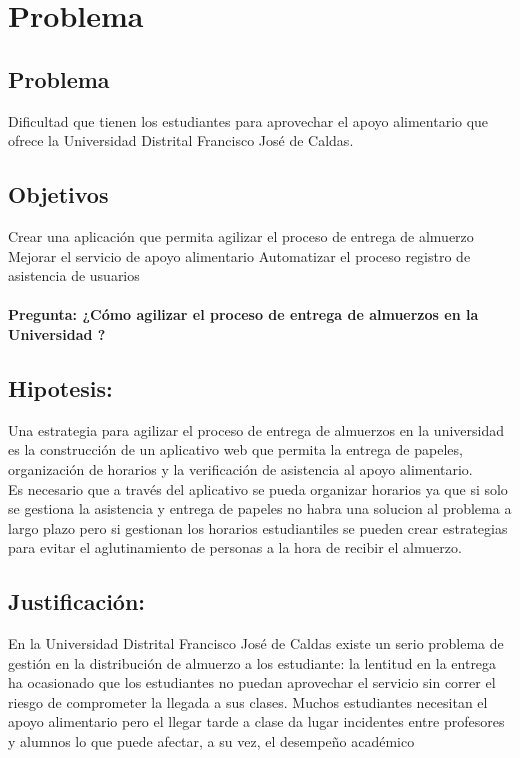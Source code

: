 \chapter{Problema}
\section{Problema}

Dificultad que tienen los estudiantes para aprovechar el apoyo alimentario que ofrece la Universidad Distrital Francisco José de Caldas.



\section{Objetivos}

Crear una aplicación que permita agilizar el proceso de entrega de almuerzo
Mejorar el servicio de apoyo alimentario 
Automatizar el proceso registro de asistencia de usuarios
\\
\\
\textbf{Pregunta: ¿Cómo agilizar el proceso de entrega de almuerzos en la Universidad ?}

\section{Hipotesis:}

Una estrategia para agilizar el proceso de entrega de almuerzos en la universidad es la construcción de un aplicativo web que permita la entrega de papeles, organización de horarios y la verificación de asistencia al apoyo alimentario.
\\
Es necesario que a través del aplicativo se pueda organizar horarios ya que si solo se gestiona la asistencia y entrega de papeles no habra una solucion al problema a largo plazo pero si gestionan los horarios estudiantiles se pueden crear estrategias para evitar el aglutinamiento de personas a la hora de recibir el almuerzo.
\\
\section{Justificación:}
En la Universidad Distrital Francisco José de Caldas existe un serio problema de gestión en la distribución de almuerzo a los estudiante:  la lentitud en la entrega ha ocasionado que los estudiantes no puedan aprovechar el servicio sin correr el riesgo de comprometer la llegada a sus clases. Muchos estudiantes necesitan el apoyo alimentario pero el llegar tarde a clase da lugar incidentes entre profesores y alumnos lo que  puede afectar, a su vez, el desempeño académico
